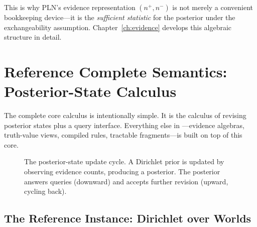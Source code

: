 \documentclass[11pt,openany]{report}
\begin{document}
This is why PLN's evidence representation $(n^+, n^-)$ is not merely a
convenient bookkeeping device---it is the \emph{sufficient statistic} for
the posterior under the exchangeability assumption.  Chapter~\ref{ch:evidence}
develops this algebraic structure in detail.


\chapter{Reference Complete Semantics: Posterior-State Calculus}
\label{ch:posterior-state}

The complete core calculus is intentionally simple.  It is the calculus of
revising posterior states plus a query interface.  Everything else in
\xiPLN{}---evidence algebras, truth-value views, compiled rules, tractable
fragments---is built on top of this core.

\begin{figure}[htbp]
\centering
{}
\caption{The posterior-state update cycle.  A Dirichlet prior is updated by
observing evidence counts, producing a posterior.  The posterior answers
queries (downward) and accepts further revision (upward, cycling back).}
\label{fig:posterior-update-cycle}
\end{figure}

\section{The Reference Instance: Dirichlet over Worlds}
\end{document}
